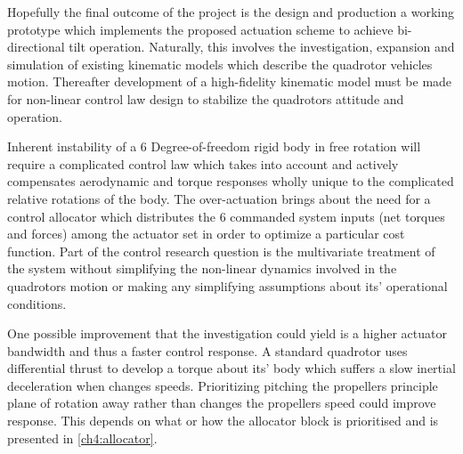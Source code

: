 \par
Hopefully the final outcome of the project is the design and production a working prototype which implements the proposed actuation scheme to achieve bi-directional tilt operation. Naturally, this involves the investigation, expansion and simulation of existing kinematic models which describe the quadrotor vehicles motion. Thereafter development of a high-fidelity kinematic model must be made for non-linear control law design to stabilize the quadrotors attitude and operation.   
\par
Inherent instability of a 6 Degree-of-freedom rigid body in free rotation will require a complicated control law which takes into account and actively compensates aerodynamic and torque responses wholly unique to the complicated relative rotations of the body. The over-actuation brings about the need for a control allocator which distributes the 6 commanded system inputs (net torques and forces) among the actuator set in order to optimize a particular cost function. Part of the control research question is the multivariate treatment of the system without simplifying the non-linear dynamics involved in the quadrotors motion or making any simplifying assumptions about its' operational conditions.
\par
One possible improvement that the investigation could yield is a higher actuator bandwidth and thus a faster control response. A standard quadrotor uses differential thrust to develop a torque about its' body which suffers a slow inertial deceleration when changes speeds. Prioritizing pitching the propellers principle plane of rotation away rather than changes the propellers speed could improve response. This depends on what or how the allocator block is prioritised and is presented in \ref{ch4:allocator}.
